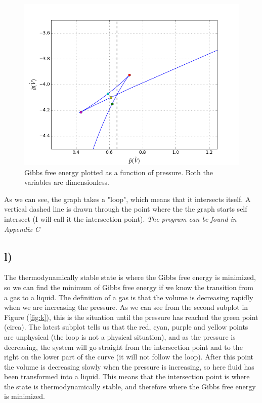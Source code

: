 \documentclass{scrartcl}
\begin{document}
\begin{figure}[H]
\centering
\includegraphics[width=150mm]{oblig3_4.png}
\caption{Gibbs free energy plotted as a function of pressure. Both the variables are dimensionless.}
\label{fig:k2}
\end{figure}
As we can see, the graph takes a "loop", which means that it intersects itself. A vertical dashed line is drawn through the point where the the graph starts self intersect (I will call it the intersection point). 
\newline\textit{The program can be found in Appendix C}

\subsection*{l)}
The thermodynamically stable state is where the Gibbs free energy is minimized, so we can find the minimum of Gibbs free energy if we know the transition from a gas to a liquid. The definition of a gas is that the volume is decreasing rapidly when we are increasing the pressure. As we can see from the second subplot in Figure (\ref{fig:k}), this is the situation until the pressure has reached the green point (circa). The latest subplot tells us that the red, cyan, purple and yellow points are unphysical (the loop is not a physical situation), and as the pressure is decreasing, the system will go straight from the intersection point and to the right on the lower part of the curve (it will not follow the loop). After this point the volume is decreasing slowly when the pressure is increasing, so here fluid has been transformed into a liquid. This means that the intersection point is where the state is thermodynamically stable, and therefore where the Gibbs free energy is minimized. 
\end{document}

